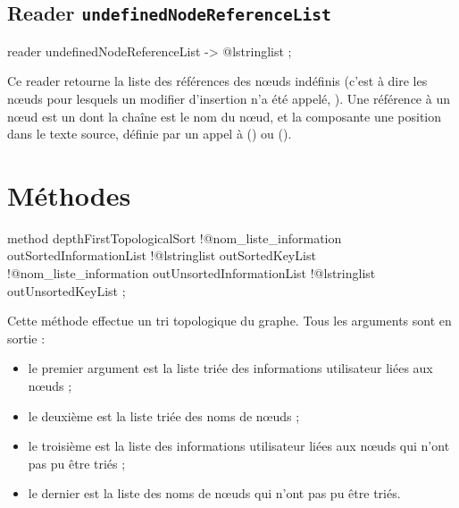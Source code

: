 \subsection{Reader \texttt{undefinedNodeReferenceList}}

\begin{galgascode}
reader undefinedNodeReferenceList -> @lstringlist ;
\end{galgascode}

Ce reader retourne la liste des références des nœuds indéfinis (c'est à dire les nœuds pour lesquels un modifier d'insertion n'a été appelé, ). Une référence à un nœud est un  dont la chaîne est le nom du nœud, et la composante  une position dans le texte source, définie par un appel à  () ou  ().




\section{Méthodes}


\begin{galgascode}
method depthFirstTopologicalSort
  !@nom_liste_information outSortedInformationList
  !@lstringlist outSortedKeyList
  !@nom_liste_information outUnsortedInformationList
  !@lstringlist outUnsortedKeyList
;
\end{galgascode}

Cette méthode effectue un tri topologique du graphe. Tous les arguments sont en sortie :
\begin{itemize}
  \item le premier argument  est la liste triée des informations utilisateur liées aux nœuds ;
  \item le deuxième  est la liste triée des noms de nœuds ;
  \item le troisième  est la liste des informations utilisateur liées aux nœuds qui n'ont pas pu être triés ;
  \item le dernier  est la liste des noms de nœuds qui n'ont pas pu être triés.
\end{itemize}

